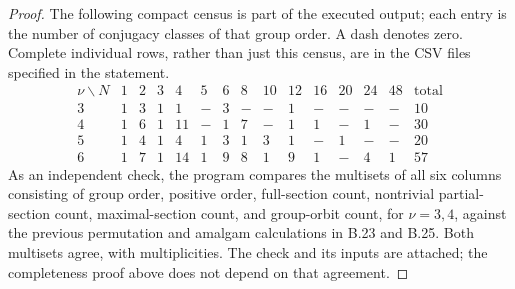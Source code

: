 \begin{proof}
The following compact census is part of the executed output; each
entry is the number of conjugacy classes of that group order.  A dash
denotes zero.  Complete individual rows, rather than just this census,
are in the CSV files specified in the statement.
\[
\begin{array}{c|rrrrrrrrrrrrr|r}
\nu\backslash N&1&2&3&4&5&6&8&10&12&16&20&24&48&\text{total}\\\hline
3&1&3&1&1&-&3&-&-&1&-&-&-&-&10\\
4&1&6&1&11&-&1&7&-&1&1&-&1&-&30\\
5&1&4&1&4&1&3&1&3&1&-&1&-&-&20\\
6&1&7&1&14&1&9&8&1&9&1&-&4&1&57
\end{array}                                                    \tag{B.26.6}
\]
As an independent check, the program compares the multisets of all
six columns consisting of group order, positive order, full-section
count, nontrivial partial-section count, maximal-section count, and
group-orbit count, for $\nu=3,4$, against the previous permutation and
amalgam calculations in B.23 and B.25.  Both multisets agree, with
multiplicities.  The check and its inputs are attached; the completeness
proof above does not depend on that agreement.
\end{proof}
